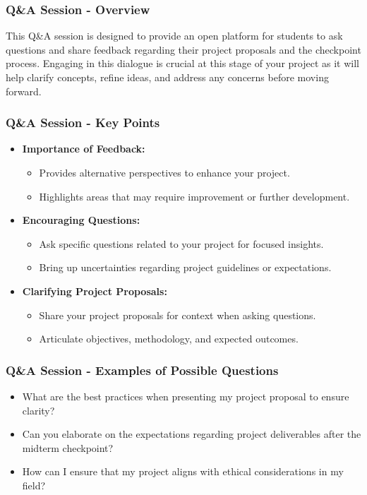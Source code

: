 \documentclass[aspectratio=169]{beamer}
\begin{document}
\begin{frame}[fragile]
    \frametitle{Q\&A Session - Overview}
    This Q\&A session is designed to provide an open platform for students to ask questions and share feedback regarding their project proposals and the checkpoint process. Engaging in this dialogue is crucial at this stage of your project as it will help clarify concepts, refine ideas, and address any concerns before moving forward.
\end{frame}

\begin{frame}[fragile]
    \frametitle{Q\&A Session - Key Points}
    \begin{itemize}
        \item \textbf{Importance of Feedback:}
        \begin{itemize}
            \item Provides alternative perspectives to enhance your project.
            \item Highlights areas that may require improvement or further development.
        \end{itemize}
        \item \textbf{Encouraging Questions:}
        \begin{itemize}
            \item Ask specific questions related to your project for focused insights.
            \item Bring up uncertainties regarding project guidelines or expectations.
        \end{itemize}
        \item \textbf{Clarifying Project Proposals:}
        \begin{itemize}
            \item Share your project proposals for context when asking questions.
            \item Articulate objectives, methodology, and expected outcomes.
        \end{itemize}
    \end{itemize}
\end{frame}

\begin{frame}[fragile]
    \frametitle{Q\&A Session - Examples of Possible Questions}
    \begin{itemize}
        \item What are the best practices when presenting my project proposal to ensure clarity?
        \item Can you elaborate on the expectations regarding project deliverables after the midterm checkpoint?
        \item How can I ensure that my project aligns with ethical considerations in my field?
    \end{itemize}
\end{frame}
\end{document}
